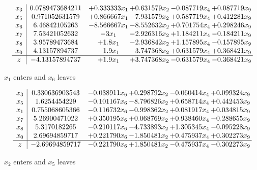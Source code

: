 \documentclass[12pt]{article}
\begin{document}
 \[\begin{array}{c| c c@{\hskip 2pt} c@{\hskip 2pt} c@{\hskip 2pt} c@{\hskip 2pt} }
 x_{3}   &  0.0789473684211 & + 0.333333 x_{1} & + 0.631579 x_{2} & -0.087719 x_{4} & + 0.087719 x_{9}\\
 x_{5}   &  0.971052631579 & + 0.866667 x_{1} & -7.931579 x_{2} & + 0.587719 x_{4} & + 0.412281 x_{9}\\
 x_{6}   &  6.46842105263 & -8.566667 x_{1} & -8.552632 x_{2} & + 0.701754 x_{4} & + 0.298246 x_{9}\\
 x_{7}   &  7.53421052632 & -3 x_{1} & -2.926316 x_{2} & + 1.184211 x_{4} & -0.184211 x_{9}\\
 x_{8}   &  3.95789473684 & + 1.8 x_{1} & -2.936842 x_{2} & + 1.157895 x_{4} & -0.157895 x_{9}\\
 x_{0}   &  4.13157894737 & -1.9 x_{1} & -3.747368 x_{2} & + 0.631579 x_{4} & + 0.368421 x_{9}\\
\hline
z    &  -4.13157894737 & + 1.9 x_{1} & + 3.747368 x_{2} & -0.631579 x_{4} & -0.368421 x_{9}\\
\end{array}\]


 $ x_{1} $ enters and $ x_{6} $ leaves 

 \[\begin{array}{c| c c@{\hskip 2pt} c@{\hskip 2pt} c@{\hskip 2pt} c@{\hskip 2pt} }
 x_{3}   &  0.330636903543 & -0.038911 x_{6} & + 0.298792 x_{2} & -0.060414 x_{4} & + 0.099324 x_{9}\\
 x_{5}   &  1.6254454229 & -0.101167 x_{6} & -8.796826 x_{2} & + 0.658714 x_{4} & + 0.442453 x_{9}\\
 x_{1}   &  0.755068605366 & -0.116732 x_{6} & -0.998362 x_{2} & + 0.081917 x_{4} & + 0.034815 x_{9}\\
 x_{7}   &  5.26900471022 & + 0.350195 x_{6} & + 0.068769 x_{2} & + 0.938460 x_{4} & -0.288655 x_{9}\\
 x_{8}   &  5.3170182265 & -0.210117 x_{6} & -4.733893 x_{2} & + 1.305345 x_{4} & -0.095228 x_{9}\\
 x_{0}   &  2.69694859717 & + 0.221790 x_{6} & -1.850481 x_{2} & + 0.475937 x_{4} & + 0.302273 x_{9}\\
\hline
z    &  -2.69694859717 & -0.221790 x_{6} & + 1.850481 x_{2} & -0.475937 x_{4} & -0.302273 x_{9}\\
\end{array}\]


 $ x_{2} $ enters and $ x_{5} $ leaves 
\end{document}
